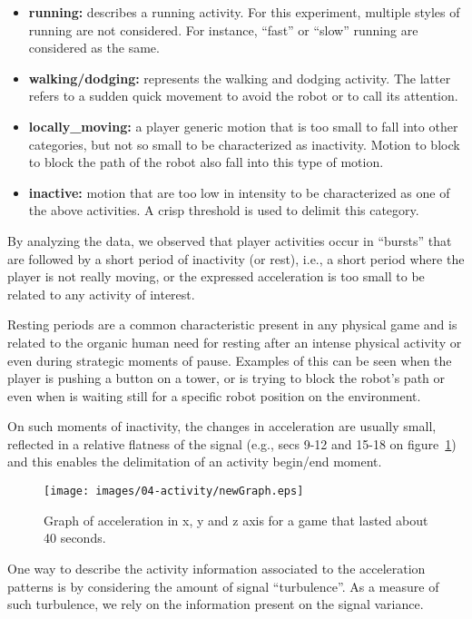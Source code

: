 \begin{itemize}
\item  \textbf{running:} describes a running activity. For this experiment, multiple styles of running are not considered. For instance, ``fast'' or ``slow'' running are considered as the same.
\item \textbf{walking/dodging:} represents the walking and dodging activity. The latter refers to a sudden quick movement to avoid the robot or to call its attention.
\item  \textbf{locally\_moving:} a player generic motion that is too small to fall into other categories, but not so small to be characterized as inactivity. Motion to block to block the path of the robot also fall into this type of motion.
\item  \textbf{inactive:} motion that are too low in intensity to be characterized as one of the above activities. A crisp threshold is used to delimit this category. 
\end{itemize}

By analyzing the data, we observed that player activities occur in ``bursts'' that are followed by a short period of inactivity (or rest), i.e., a short period where the player is not really moving, or the expressed acceleration is too small to be related to any activity of interest.

Resting periods are a common characteristic present in any physical game and is related to the organic human need for resting after an intense physical activity or even during strategic moments of pause. Examples of this can be seen when the player is pushing a button on a tower, or is trying to block the robot's path or even when is waiting still for a specific robot position on the environment.

On such moments of inactivity, the changes in acceleration are usually small, reflected in a relative flatness of the signal (e.g., secs 9-12 and 15-18 on figure~\ref{acc_graph}) and this enables the delimitation of an activity begin/end moment.

\begin{figure}[h!]
      \centering
      \texttt{[image: images/04-activity/newGraph.eps]}
      \caption{Graph of acceleration in x, y and z axis for a game that lasted about 40 seconds.}
      \label{acc_graph}
\end{figure}

One way to describe the activity information associated to the acceleration patterns is by considering the amount of signal ``turbulence''. As a measure of such turbulence, we rely on the information present on the signal variance. 

